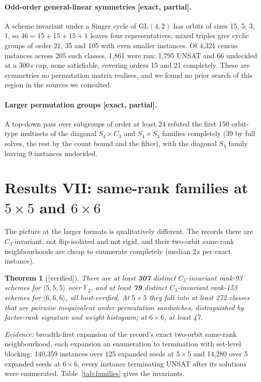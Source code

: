 \documentclass[11pt]{article}
\newtheorem{theorem}{Theorem}
\newcommand{\FF}{\mathbb{F}_2}
\newcommand{\tw}[3]{\langle #1,#2,#3\rangle}
\newcommand{\GL}{\mathrm{GL}}
\begin{document}
\paragraph{Odd-order general-linear symmetries [exact, partial].} A scheme invariant under a Singer cycle
of $\GL(4,2)$ has orbits of sizes 15, 5, 3, 1, so $46 = 15+15+15+1$ leaves four representatives; mixed
triples give cyclic groups of order 21, 35 and 105 with even smaller instances. Of 4{,}321 census
instances across 205 such classes, 1{,}861 were run: 1{,}795 UNSAT and 66 undecided at a 300\,s cap, none
satisfiable, covering orders 15 and 21 completely. These are symmetries no permutation matrix realises,
and we found no prior search of this region in the sources we consulted.

\paragraph{Larger permutation groups [exact, partial].} A top-down pass over subgroups of order at least
24 refuted the first 150 orbit-type multisets of the diagonal $S_4\times C_3$ and $S_4\times S_3$ families
completely (39 by full solves, the rest by the count bound and the filter), with the diagonal $S_4$ family
leaving 9 instances undecided.

\section{Results VII: same-rank families at $5\times5$ and $6\times6$}
\label{sec:families}

The picture at the larger formats is qualitatively different. The records there are $C_3$-invariant, not
flip-isolated and not rigid, and their two-orbit same-rank neighbourhoods are cheap to enumerate
completely (median 2\,s per exact instance).

\begin{theorem}[{[verified]}]
\label{thm:family}
There are at least \textbf{307} distinct $C_3$-invariant rank-93 schemes for $\tw555$ over $\FF$, and at
least \textbf{79} distinct $C_3$-invariant rank-153 schemes for $\tw666$, all host-verified. At
$5\times5$ they fall into at least 272 classes that are pairwise inequivalent under permutation
sandwiches, distinguished by factor-rank signature and weight histogram; at $6\times6$, at least 47.
\end{theorem}
\noindent\emph{Evidence:} breadth-first expansion of the record's exact two-orbit same-rank
neighbourhood, each expansion an enumeration to termination with set-level blocking: 140{,}359 instances
over 125 expanded seeds at $5\times5$ and 14{,}280 over 5 expanded seeds at $6\times6$, every instance
terminating UNSAT after its solutions were enumerated. Table~\ref{tab:families} gives the invariants.
\end{document}
